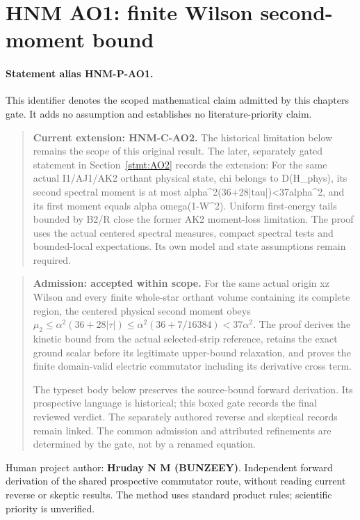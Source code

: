 \hypertarget{r29-ao1-ao1-forward-hnm-finite-wilson-second-moment-bound}{%
\section{HNM AO1: finite Wilson second-moment bound\workstar}\label{r29:ao1:r29-ao1-ao1-forward-hnm-finite-wilson-second-moment-bound}}
\paragraph{Statement alias HNM-P-AO1.}\label{stmt:AO1} This identifier denotes the scoped mathematical claim admitted by this chapter\textquotesingle s gate. It adds no assumption and establishes no literature-priority claim.
\begin{quote}\small\textbf{Current extension: HNM-C-AO2.} The historical limitation below remains the scope of this original result. The later, separately gated statement in Section~\ref{stmt:AO2} records the extension: For the same actual I1/AJ1/AK2 orthant physical state, chi belongs to D(H\_phys), its second spectral moment is at most alpha\textasciicircum{}2(36+28|tau|)<37alpha\textasciicircum{}2, and its first moment equals alpha omega(1-W\textasciicircum{}2). Uniform first-energy tails bounded by B2/R close the former AK2 moment-loss limitation. The proof uses the actual centered spectral measures, compact spectral tests and bounded-local expectations. Its own model and state assumptions remain required.\end{quote}

\begin{quote}\small \textbf{Admission: accepted within scope.} For the same actual origin xz Wilson and every finite whole-star orthant volume containing its complete region, the centered physical second moment obeys \(\mu_2\le \alpha^{2}(36+28|\tau|)\le \alpha^{2}(36+7/16384)<37\alpha^{2}\). The proof derives the kinetic bound from the actual selected-strip reference, retains the exact ground scalar before its legitimate upper-bound relaxation, and proves the finite domain-valid electric commutator including its derivative cross term.\par The typeset body below preserves the source-bound forward derivation. Its prospective language is historical; this boxed gate records the final reviewed verdict. The separately authored reverse and skeptical records remain linked. The common admission and attributed refinements are determined by the gate, not by a renamed equation.\end{quote}
Human project author: \textbf{Hruday N M (BUNZEEY)}. Independent forward derivation of the shared prospective commutator route, without reading current reverse or skeptic results. The method uses standard product rules; scientific priority is unverified.

